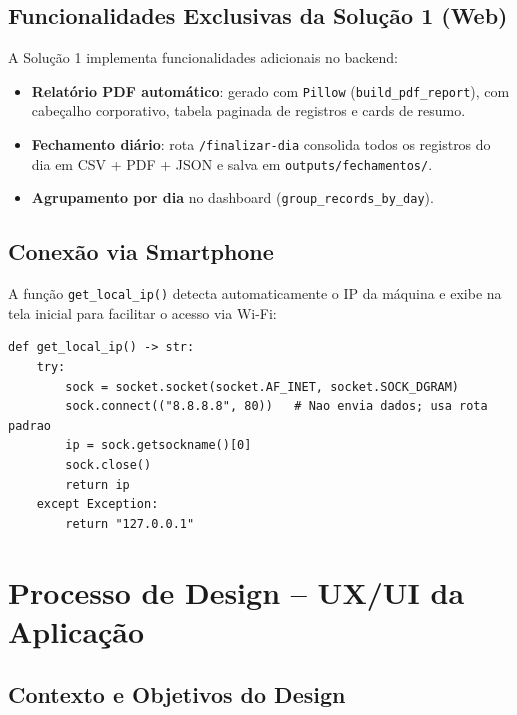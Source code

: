 \documentclass[12pt,a4paper]{article}
\begin{document}
\subsection{Funcionalidades Exclusivas da Solu\c{c}\~ao 1 (Web)}

A Solu\c{c}\~ao 1 implementa funcionalidades adicionais no backend:

\begin{itemize}[leftmargin=*]
  \item \textbf{Relat\'orio PDF autom\'atico}: gerado com \texttt{Pillow} (\texttt{build\_pdf\_report}),
        com cabe\c{c}alho corporativo, tabela paginada de registros e cards de resumo.
  \item \textbf{Fechamento di\'ario}: rota \texttt{/finalizar-dia} consolida todos os
        registros do dia em CSV + PDF + JSON e salva em \texttt{outputs/fechamentos/}.
  \item \textbf{Agrupamento por dia} no dashboard (\texttt{group\_records\_by\_day}).
\end{itemize}

\subsection{Conex\~ao via Smartphone}

A fun\c{c}\~ao \texttt{get\_local\_ip()} detecta automaticamente o IP da m\'aquina
e exibe na tela inicial para facilitar o acesso via Wi-Fi:

\begin{lstlisting}[caption={Detec\c{c}\~ao autom\'atica de IP local}]
def get_local_ip() -> str:
    try:
        sock = socket.socket(socket.AF_INET, socket.SOCK_DGRAM)
        sock.connect(("8.8.8.8", 80))   # Nao envia dados; usa rota padrao
        ip = sock.getsockname()[0]
        sock.close()
        return ip
    except Exception:
        return "127.0.0.1"
\end{lstlisting}

\section{Processo de Design -- UX/UI da Aplica\c{c}\~ao}
\label{sec:uxui}

\subsection{Contexto e Objetivos do Design}
\end{document}

